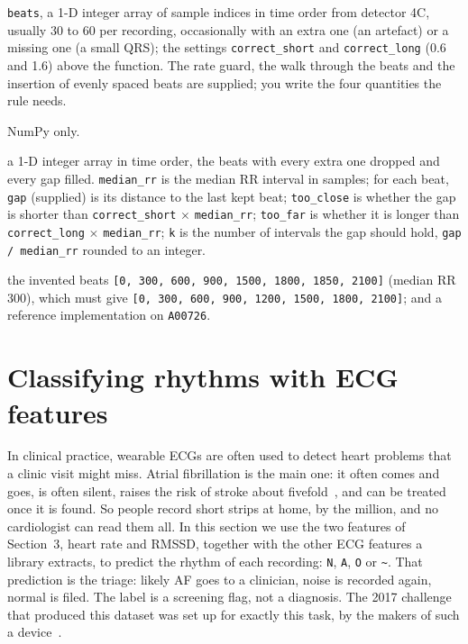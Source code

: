 \documentclass[12pt,article,oneside,linkcolour=blue]{oxengthesis}
\newcommand{\noise}{\texttt{\textasciitilde}}
\newcommand{\nb}[1]{\noindent{\small\textsf{Notebook: #1}}\par\nopagebreak\smallskip}
\begin{document}
\begin{tcolorbox}[breakable, title=Specification: \texttt{correct(beats)}, colback=white, colframe=black!60]
\begin{description}[leftmargin=*, itemsep=2pt, font=\bfseries]
  \item[Given] \texttt{beats}, a 1-D integer array of sample indices in time order from detector 4C, usually 30 to 60 per recording, occasionally with an extra one (an artefact) or a missing one (a small QRS); the settings \texttt{correct\_short} and \texttt{correct\_long} (0.6 and 1.6) above the function. The rate guard, the walk through the beats and the insertion of evenly spaced beats are supplied; you write the four quantities the rule needs.
  \item[You may use] NumPy only.
  \item[Return] a 1-D integer array in time order, the beats with every extra one dropped and every gap filled. \texttt{median\_rr} is the median RR interval in samples; for each beat, \texttt{gap} (supplied) is its distance to the last kept beat; \texttt{too\_close} is whether the gap is shorter than \texttt{correct\_short} $\times$ \texttt{median\_rr}; \texttt{too\_far} is whether it is longer than \texttt{correct\_long} $\times$ \texttt{median\_rr}; \texttt{k} is the number of intervals the gap should hold, \texttt{gap / median\_rr} rounded to an integer.
  \item[Checked by] the invented beats \texttt{[0, 300, 600, 900, 1500, 1800, 1850, 2100]} (median RR 300), which must give \texttt{[0, 300, 600, 900, 1200, 1500, 1800, 2100]}; and a reference implementation on \texttt{A00726}.
\end{description}
\end{tcolorbox}

\section{Classifying rhythms with ECG features}
\nb{Section 4}

In clinical practice, wearable ECGs are often used to detect heart problems that a clinic
visit might miss. Atrial fibrillation is the main one: it often comes and goes, is often
silent, raises the risk of stroke about fivefold~\cite{wolf1991af}, and can be treated once it
is found. So people record short strips at home, by the million, and no cardiologist can read
them all. In this section we use the two features of Section~3, heart rate and RMSSD, together
with the other ECG features a library extracts, to predict the rhythm of each recording:
\texttt{N}, \texttt{A}, \texttt{O} or \noise. That prediction is the triage: likely AF goes
to a clinician, noise is recorded again, normal is filed. The label is a screening flag, not a
diagnosis. The 2017 challenge that produced this dataset was set up for exactly this task, by
the makers of such a device~\cite{clifford2017af}.
\end{document}
